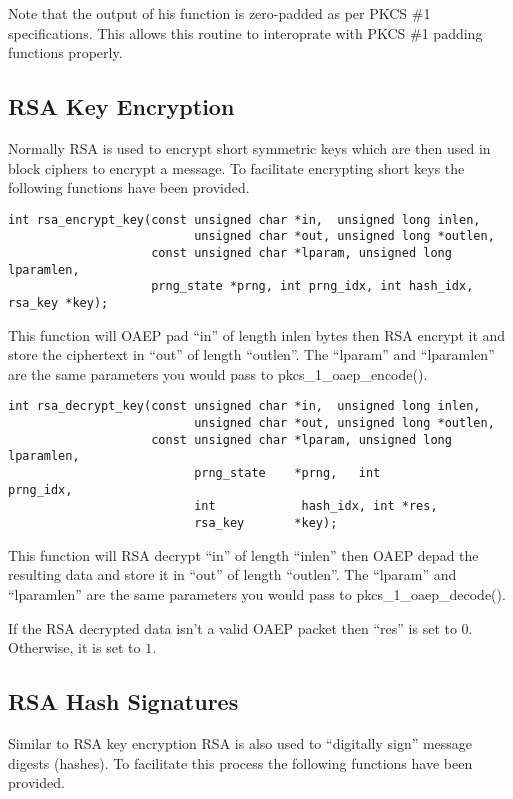 \documentclass[a4paper]{book}
\begin{document}
Note that the output of his function is zero-padded as per PKCS \#1 specifications.  This allows this routine to 
interoprate with PKCS \#1 padding functions properly.

\subsection{RSA Key Encryption}
Normally RSA is used to encrypt short symmetric keys which are then used in block ciphers to encrypt a message.
To facilitate encrypting short keys the following functions have been provided.

\begin{verbatim}
int rsa_encrypt_key(const unsigned char *in,  unsigned long inlen,
                          unsigned char *out, unsigned long *outlen,
                    const unsigned char *lparam, unsigned long lparamlen,
                    prng_state *prng, int prng_idx, int hash_idx, rsa_key *key);
\end{verbatim}
This function will OAEP pad ``in'' of length inlen bytes then RSA encrypt it and store the ciphertext
in ``out'' of length ``outlen''.  The ``lparam'' and ``lparamlen'' are the same parameters you would pass
to pkcs\_1\_oaep\_encode().

\begin{verbatim}
int rsa_decrypt_key(const unsigned char *in,  unsigned long inlen,
                          unsigned char *out, unsigned long *outlen, 
                    const unsigned char *lparam, unsigned long lparamlen,
                          prng_state    *prng,   int           prng_idx,
                          int            hash_idx, int *res,
                          rsa_key       *key);
\end{verbatim}
This function will RSA decrypt ``in'' of length ``inlen'' then OAEP depad the resulting data and store it in
``out'' of length ``outlen''.  The ``lparam'' and ``lparamlen'' are the same parameters you would pass
to pkcs\_1\_oaep\_decode().

If the RSA decrypted data isn't a valid OAEP packet then ``res'' is set to $0$.  Otherwise, it is set to $1$.

\subsection{RSA Hash Signatures}
Similar to RSA key encryption RSA is also used to ``digitally sign'' message digests (hashes).  To facilitate this
process the following functions have been provided.
\end{document}
